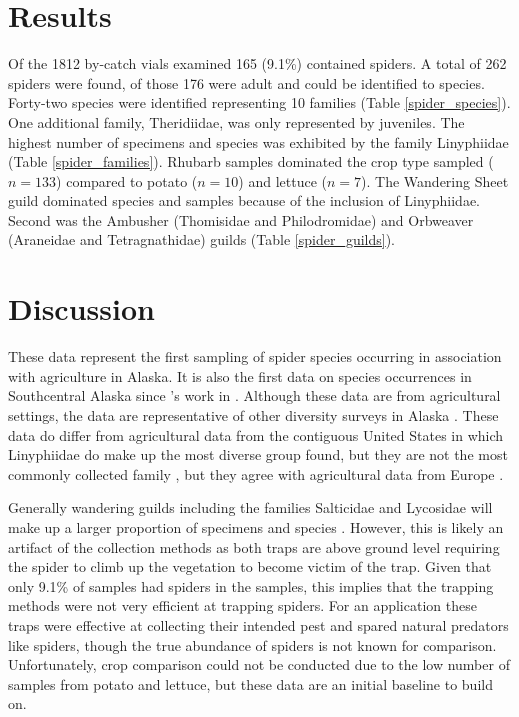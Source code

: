 \section{Results}
Of the 1812 by-catch vials examined 165 (9.1\%) contained spiders. A total of 262 spiders were found, of those 176 were adult and could be identified to species. Forty-two species were identified representing 10 families (Table \ref{spider_species}). One additional family, Theridiidae, was only represented by juveniles. The highest number of specimens and species was exhibited by the family Linyphiidae (Table \ref{spider_families}). Rhubarb samples dominated the crop type sampled ($n=133$) compared to potato ($n=10$) and lettuce ($n=7$). The Wandering Sheet guild dominated species and samples because of the inclusion of Linyphiidae. Second was the Ambusher (Thomisidae and Philodromidae) and Orbweaver (Araneidae and Tetragnathidae) guilds (Table \ref{spider_guilds}). 







\section{Discussion}

These data represent the first sampling of spider species occurring in association with agriculture in Alaska. It is also the first data on species occurrences in Southcentral Alaska since \citeauthor{ChamberlinIvie1947}’s work in \citeyear{ChamberlinIvie1947}. Although these data are from agricultural settings, the data are representative of other diversity surveys in Alaska \citep{Slowik2006, SlowikBlagoev2012, Sikesetal2013}.  These data do differ from agricultural data from the contiguous United States in which Linyphiidae do make up the most diverse group found, but they are not the most commonly collected family \citep{YoungEdwards1990}, but they agree with agricultural data from Europe \citep{NyffelerBirkhofer2017}. 

Generally wandering guilds including the families Salticidae and Lycosidae will make up a larger proportion of specimens and species \citep{YoungEdwards1990, Kerzicniketal2013}. However, this is likely an artifact of the collection methods as both traps are above ground level requiring the spider to climb up the vegetation to become victim of the trap. Given that only 9.1\% of samples had spiders in the samples, this implies that the trapping methods were not very efficient at trapping spiders. For an  application these traps were effective at collecting their intended pest and spared natural predators like spiders, though the true abundance of spiders is not known for comparison. Unfortunately, crop comparison could not be conducted due to the low number of samples from potato and lettuce, but these data are an initial baseline to build on. 

